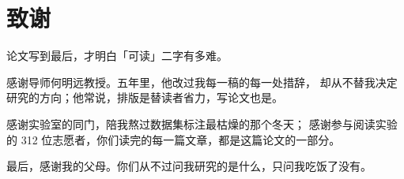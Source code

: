 \chapter{致\quad 谢}

论文写到最后，才明白「可读」二字有多难。

感谢导师何明远教授。五年里，他改过我每一稿的每一处措辞，
却从不替我决定研究的方向；他常说，排版是替读者省力，写论文也是。

感谢实验室的同门，陪我熬过数据集标注最枯燥的那个冬天；
感谢参与阅读实验的 312 位志愿者，你们读完的每一篇文章，都是这篇论文的一部分。

最后，感谢我的父母。你们从不过问我研究的是什么，只问我吃饭了没有。
